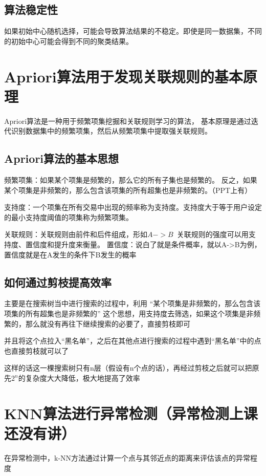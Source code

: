 \documentclass[10pt]{article}
\begin{document}
	\subsection{算法稳定性}如果初始中心随机选择，可能会导致算法结果的不稳定。即使是同一数据集，不同的初始中心可能会得到不同的聚类结果。
	
	
	\section{Apriori算法用于发现关联规则的基本原理}
	Apriori算法是一种用于频繁项集挖掘和关联规则学习的算法，
	基本原理是通过迭代识别数据集中的频繁项集，然后从频繁项集中提取强关联规则。
	
	\subsection{Apriori算法的基本思想}
	频繁项集：如果某个项集是频繁的，那么它的所有子集也是频繁的。
	反之，如果某个项集是非频繁的，那么包含该项集的所有超集也是非频繁的。（PPT上有）\par
	支持度：一个项集在所有交易中出现的频率称为支持度。支持度大于等于用户设定的最小支持度阈值的项集称为频繁项集。\par
	关联规则：关联规则由前件和后件组成，形如$A->B$\,
	关联规则的强度可以用支持度、置信度和提升度来衡量。
	置信度：说白了就是条件概率，就以A->B为例，置信度就是在A发生的条件下B发生的概率\par
	
	\subsection{如何通过剪枝提高效率}
	主要是在搜索树当中进行搜索的过程中，利用
	“某个项集是非频繁的，那么包含该项集的所有超集也是非频繁的”
	这个思想，用支持度去筛选，如果这个项集是非频繁的，那么就没有再往下继续搜索的必要了，直接剪枝即可\par
	并且将这个点拉入“黑名单”，之后在其他点进行搜索的过程中遇到“黑名单”中的点也直接剪枝就可以了\par
	这样的话这一棵搜索树只有n层（假设有n个点的话），再经过剪枝之后就可以把原先$2^n$的复杂度大大降低，极大地提高了效率
	
	
	
	\section{KNN算法进行异常检测（异常检测上课还没有讲）}
	在异常检测中，k-NN方法通过计算一个点与其邻近点的距离来评估该点的异常程度
\end{document}
